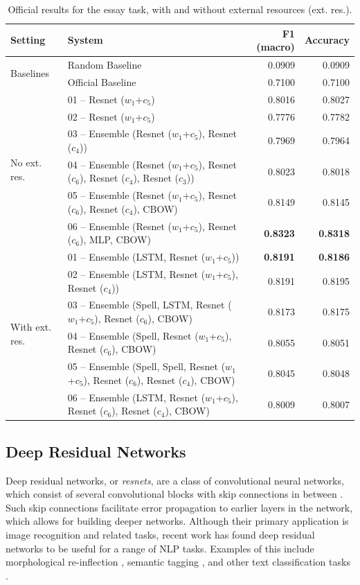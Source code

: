 \documentclass[11pt,letterpaper]{article}
\begin{document}
\setlength{\tabcolsep}{4.5pt}
\begin{table}[htbp]
    \small
\centering
\caption{Official results for the essay task, with and without external resources (ext. res.).}
\label{tab:results}
\begin{tabular}{llrr}
\toprule
\bf Setting & \bf System & \bf F1 (macro) & \bf Accuracy \\
\midrule
\multirow{2}{*}{Baselines}& Random Baseline & 0.0909 & 0.0909 \\
& Official Baseline & 0.7100 & 0.7100 \\
\midrule
\multirow{6}{*}{No ext. res.} & 01 -- Resnet ($w_1$+$c_5$) & 0.8016 & 0.8027 \\
& 02 -- Resnet ($w_1$+$c_5$) & 0.7776 & 0.7782 \\
& 03 -- Ensemble (Resnet ($w_1$+$c_5$), Resnet ($c_4$)) & 0.7969 & 0.7964 \\
& 04 -- Ensemble (Resnet ($w_1$+$c_5$), Resnet ($c_6$), Resnet ($c_4$), Resnet ($c_3$)) & 0.8023 & 0.8018 \\
& 05 -- Ensemble (Resnet ($w_1$+$c_5$), Resnet ($c_6$), Resnet ($c_4$), CBOW) & 0.8149 & 0.8145 \\
& 06 -- Ensemble (Resnet ($w_1$+$c_5$), Resnet ($c_6$), MLP, CBOW) & \bf 0.8323 & \bf 0.8318 \\
\midrule
\multirow{6}{*}{With ext. res.} & 01 -- Ensemble (LSTM, Resnet ($w_1$+$c_5$)) & \bf 0.8191 & \bf 0.8186 \\
& 02 -- Ensemble (LSTM, Resnet ($w_1$+$c_5$), Resnet ($c_4$)) & 0.8191   &  0.8195 \\
& 03 -- Ensemble (Spell, LSTM, Resnet ($w_1$+$c_5$), Resnet ($c_6$), CBOW) & 0.8173   &  0.8175 \\
& 04 -- Ensemble (Spell, Resnet ($w_1$+$c_5$), Resnet ($c_6$), CBOW) & 0.8055   &  0.8051 \\
& 05 -- Ensemble (Spell, Spell, Resnet ($w_1$+$c_5$), Resnet ($c_6$), Resnet ($c_4$), CBOW) & 0.8045   &  0.8048 \\
& 06 -- Ensemble (LSTM, Resnet ($w_1$+$c_5$), Resnet ($c_6$), Resnet ($c_4$), CBOW)& 0.8009   &  0.8007 \\
\bottomrule
\end{tabular}
\end{table}
\subsection{Deep Residual Networks}
Deep residual networks, or \textit{resnets}, are a class of convolutional neural networks, which consist of several convolutional blocks with skip connections in between \citep{resnets:2015,He2016identity}.
Such skip connections facilitate error propagation to earlier layers in the network, which allows for building deeper networks.
Although their primary application is image recognition and related tasks, recent work has found deep residual networks to be useful for a range of NLP tasks.
Examples of this include morphological re-inflection \citep{robert:sigmorphon:2016},
semantic tagging \citep{bjerva:2016:semantic}, and other text classification tasks \citep{conneau:2016}.
\end{document}
